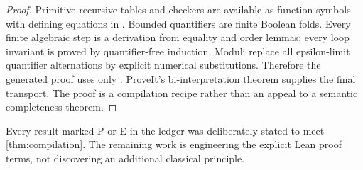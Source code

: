 \begin{proof}
Primitive-recursive tables and checkers are available as function symbols with defining equations in \ipra.  Bounded quantifiers are finite Boolean folds.  Every finite algebraic step is a derivation from equality and order lemmas; every loop invariant is proved by quantifier-free induction.  Moduli replace all epsilon-limit quantifier alternations by explicit numerical substitutions.  Therefore the generated proof uses only .  ProveIt's bi-interpretation theorem supplies the final transport.  The proof is a compilation recipe rather than an appeal to a semantic completeness theorem.
\end{proof}

Every result marked P or E in the ledger was deliberately stated to meet \cref{thm:compilation}.  The remaining work is engineering the explicit Lean proof terms, not discovering an additional classical principle.
